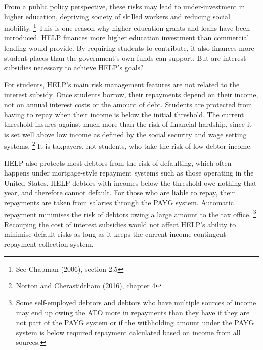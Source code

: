 \documentclass[embargoed]{grattan}
\begin{document}
From a public policy perspective, these risks may lead to under-investment in higher education, depriving society of skilled workers and reducing social mobility.%
\footnote{See Chapman (2006), section 2.5} This is one reason why higher education grants and loans have been introduced.
HELP finances more higher education investment than commercial lending would provide.
By requiring students to contribute, it also finances more student places than the government's own funds can support.
But are interest subsidies necessary to achieve HELP's goals?

For students, HELP's main risk management features are not related to the interest subsidy.
Once students borrow, their repayments depend on their income, not on annual interest costs or the amount of debt.
Students are protected from having to repay when their income is below the initial threshold.
The current threshold insures against much more than the risk of financial hardship, since it is set well above low income as defined by the social security and wage setting systems.%
\footnote{Norton and Cherastidtham (2016), chapter 4} It is taxpayers, not students, who take the risk of low debtor income.

HELP also protects most debtors from the risk of defaulting, which often happens under mortgage-style repayment systems such as those operating in the United States.
HELP debtors with incomes below the threshold owe nothing that year, and therefore cannot default.
For those who are liable to repay, their repayments are taken from salaries through the PAYG system.
Automatic repayment minimises the risk of debtors owing a large amount to the tax office.%
\footnote{Some self-employed debtors and debtors who have multiple sources of income may end up owing the \gls{ATO} more in repayments than they have if they are not part of the PAYG system or if the withholding amount under the PAYG system is below required repayment calculated based on income from all sources.} Recouping the cost of interest subsidies would not affect HELP's ability to minimise default risks as long as it keeps the current income-contingent repayment collection system.
\end{document}
